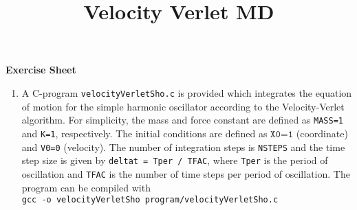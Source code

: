 \documentclass[a4paper,12pt]{article}
\makeatletter
\def\maketitle{%
  \begin{center}
    {\Large \bf Exercise Sheet \@title\par}%
    \vskip 0.5cm
    {\normalfont \@date\par}%
  \end{center}%
    \vskip 1.0cm
  }
\makeatother
\begin{document}
\title{{Velocity Verlet MD}}
\date{}
\maketitle


%
\renewcommand{\labelenumi}{\arabic{enumi}.}
%
%
%
\begin{enumerate}
\item A C-program \texttt{velocityVerletSho.c} is provided which integrates
the equation of motion for the simple harmonic oscillator according to the Velocity-Verlet algorithm. For simplicity, the mass and force constant are defined
as  \texttt{MASS=1} and \texttt{K=1}, respectively. The initial conditions are defined as $\texttt{X0=1}$ (coordinate)
and \texttt{V0=0} (velocity). 
The number of integration steps is \texttt{NSTEPS}  and the time step size is given by \texttt{deltat = Tper / TFAC}, where \texttt{Tper} is the period of oscillation and \texttt{TFAC} is the number of time steps per period of oscillation.
The program can be compiled with\\
\noindent \texttt{gcc -o velocityVerletSho program/velocityVerletSho.c}\\

\end{enumerate}
\end{document}
